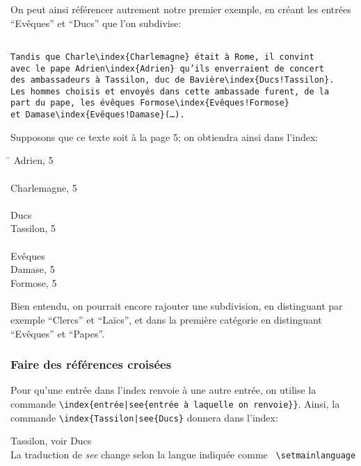 On peut ainsi référencer autrement notre premier exemple, en créant les entrées \enquote{Evêques} et \enquote{Ducs} que l'on subdivise:

\begin{verbatim}

Tandis que Charle\index{Charlemagne} était à Rome, il convint 
avec le pape Adrien\index{Adrien} qu’ils enverraient de concert 
des ambassadeurs à Tassilon, duc de Bavière\index{Ducs!Tassilon}.
Les hommes choisis et envoyés dans cette ambassade furent, de la 
part du pape, les évêques Formose\index{Evêques!Formose}
et Damase\index{Evêques!Damase}(…).

\end{verbatim}

Supposons que ce texte soit à la page 5; on obtiendra ainsi dans l'index:
\begin{tabbing}
\hspace{0,5cm}  \= \kill
Adrien, 5 \\
\\
Charlemagne, 5 \\
\\
Ducs \\
\> Tassilon, 5\\
\\
Evêques \\
\> Damase, 5\\
\> Formose, 5\\

\end{tabbing}




Bien entendu, on pourrait encore rajouter une subdivision, en distinguant par exemple \enquote{Clercs} et \enquote{Laïcs}, et dans la première catégorie en distinguant \enquote{Evêques} et \enquote{Papes}. 

 
\subsubsection{Faire des références croisées}

Pour qu'une entrée dans l'index renvoie à une autre entrée, on utilise la commande  \verb+\index{entrée|see{entrée à laquelle on renvoie}}+. Ainsi, la commande \verb+\index{Tassilon|see{Ducs}+ donnera dans l'index:

Tassilon, voir Ducs\\
La traduction de \emph{see} change selon la langue indiquée comme \verb+ \setmainlanguage+


